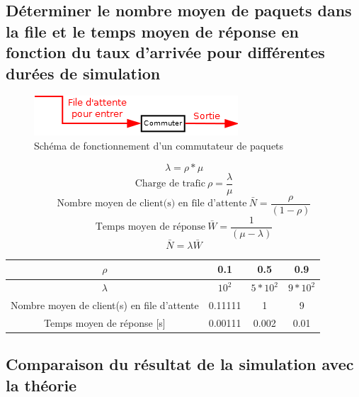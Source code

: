         \subsection{Déterminer le nombre moyen de paquets dans la file et le temps moyen de réponse en fonction du taux d'arrivée pour différentes durées de simulation}
%
            \begin{figure}[h]
                \centering
                \includegraphics[scale=0.7]{RSC/2-1.png}
                \caption{ Schéma de fonctionnement d'un commutateur de paquets }
                \label{ Schema de fonctionnement d'un commutateur de paquets }
            \end{figure}
%
            \[  \lambda = \rho * \mu \]
            \[  \text{Charge de trafic} \ \rho = \frac{\lambda}{\mu} \]
            \[  \text{Nombre moyen de client(s) en file d'attente} \ \bar{N} = \frac{\rho}{(1 - \rho)} \]
            \[  \text{Temps moyen de réponse} \ \bar{W} = \frac{1}{(\mu - \lambda)} \]
            \[  \bar{N} = \lambda \bar{W} \]
%
            \begin{center}
                \begin{tabular}{ | c | c| c | c | }
                    \hline
                        $\rho$                                          & 0.1       & 0.5           & 0.9           \\
                    \hline
                        $\lambda$                                       & $10^{2}$  & $5 * 10^{2}$  & $9 * 10^{2}$  \\
                    \hline
                        Nombre moyen de client(s) en file d'attente     & 0.11111   & 1             & 9             \\
                    \hline
                        Temps moyen de réponse [s]                      & 0.00111   & 0.002         & 0.01          \\
                    \hline
                \end{tabular}
            \end{center}
%
%
\clearpage
%
%
        \subsection{Comparaison du résultat de la simulation avec la théorie}
%
